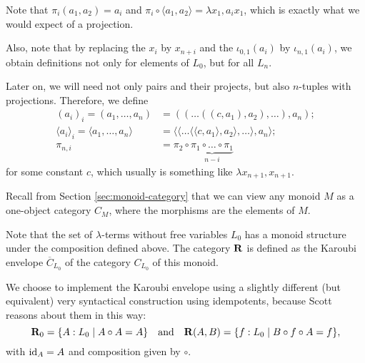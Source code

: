 Note that $ \pi_i (a_1, a_2) = a_i $ and $ \pi_i \circ \langle a_1, a_2 \rangle = \lambda x_1, a_i x_1 $, which is exactly what we would expect of a projection.

Also, note that by replacing the $ x_i $ by $ x_{n + i} $ and the $ \iota_{0, 1}(a_i) $ by $ \iota_{n, 1}(a_i) $, we obtain definitions not only for elements of $ L_0 $, but for all $ L_n $.

Later on, we will need not only pairs and their projects, but also $ n $-tuples with projections. Therefore, we define
\begin{align*}
  (a_i)_i = (a_1, \dots, a_n) &= ((\dots((c, a_1), a_2), \dots), a_n);\\
  \langle a_i \rangle_i = \langle a_1, \dots, a_n \rangle &= \langle\langle\dots\langle\langle c, a_1\rangle, a_2\rangle, \dots\rangle, a_n\rangle;\\
  \pi_{n, i} &= \pi_2 \circ \underbrace{\pi_1 \circ \dots \circ \pi_1}_{n - i}
\end{align*}
for some constant $ c $, which usually is something like $ \lambda x_{n + 1}, x_{n + 1} $.

Recall from Section \ref{sec:monoid-category} that we can view any monoid $ M $ as a one-object category $ C_M $, where the morphisms are the elements of $ M $.

\begin{definition}
  Note that the set of $ \lambda $-terms without free variables $ L_0 $ has a monoid structure under the composition defined above. The category $ \mathbf{R} $ is defined as the Karoubi envelope $ \overline C_{L_0} $ of the category $ C_{L_0} $ of this monoid.

  We choose to implement the Karoubi envelope using a slightly different (but equivalent) very syntactical construction using idempotents, because Scott reasons about them in this way:
  \[ \mathbf{R}_0 = \{ A : L_0 \mid A \circ A = A \} \quad \text{and} \quad \mathbf{R}(A, B) = \{ f: L_0 \mid B \circ f \circ A = f \}, \]
  with $ \text{id}_{A} = A $ and composition given by $ \circ $.
\end{definition}

